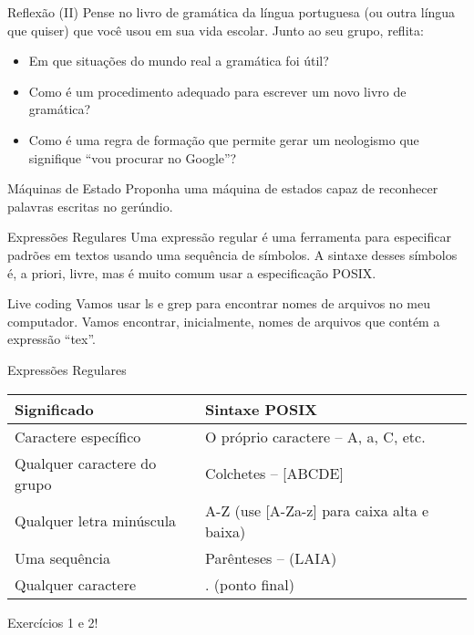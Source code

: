 \documentclass{beamer}
\begin{document}
\begin{frame}{Reflexão (II)}
  \centering
  \Large
  Pense no livro de gramática da língua portuguesa (ou outra língua que quiser)
  que você usou em sua vida escolar. Junto ao seu grupo, reflita:
  \begin{itemize}
    \item Em que situações do mundo real a gramática foi útil?
    \item Como é um procedimento adequado para escrever um novo livro de
      gramática?
    \item<2-> Como é uma regra de formação que permite gerar um neologismo que
      signifique ``vou procurar no Google''?
  \end{itemize}
\end{frame}

\begin{frame}{Máquinas de Estado}
  \centering
  \large
  Proponha uma máquina de estados capaz de reconhecer palavras escritas no
  gerúndio.
\end{frame}


\begin{frame}{Expressões Regulares}
  \centering
  \large
  Uma expressão regular é uma ferramenta para especificar padrões em textos
  usando uma sequência de símbolos. A sintaxe desses símbolos é, a priori,
  livre, mas é muito comum usar a especificação POSIX.
\end{frame}

\begin{frame}{Live coding}
  \centering
  \large
  Vamos usar ls e grep para encontrar nomes de arquivos no meu computador. Vamos
  encontrar, inicialmente, nomes de arquivos que contém a expressão ``tex''.
\end{frame}


\begin{frame}[fragile]{Expressões Regulares}
\centering
\large
  \begin{tabular}{p{5cm} | p{5cm} }
    Significado & Sintaxe POSIX \\ \hline
    Caractere específico & O próprio caractere -- A, a, C, etc. \\ \hline
    Qualquer caractere do grupo & Colchetes -- [ABCDE] \\ \hline
    Qualquer letra minúscula & A-Z (use [A-Za-z] para caixa alta e baixa) \\ \hline
    Uma sequência & Parênteses -- (LAIA) \\ \hline
    Qualquer caractere & . (ponto final) \\ \hline
  \end{tabular}

  Exercícios 1 e 2!
\end{frame}
\end{document}
